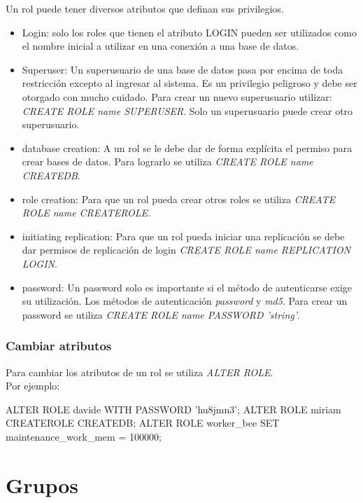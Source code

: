 Un rol puede tener diversos atributos que definan sus privilegios.\\

\begin{itemize}
\item Login: solo los roles que tienen el atributo LOGIN pueden ser utilizados como el nombre inicial a utilizar en una conexión a una base de datos. 
\item Superuser: Un superusuario de una base de datos pasa por encima de toda restricción excepto al ingresar al sistema. Es un privilegio peligroso y debe ser otorgado con mucho cuidado. Para crear un nuevo superusuario utilizar: \textit{CREATE ROLE name SUPERUSER}. Solo un superusuario puede crear otro superusuario.
\item database creation: A un rol se le debe dar de forma explícita el permiso para crear bases de datos. Para lograrlo se utiliza \textit{CREATE ROLE name CREATEDB}.
\item role creation: Para que un rol pueda crear otros roles se utiliza \textit{CREATE ROLE name CREATEROLE}.
\item initiating replication: Para que un rol pueda iniciar una replicación se debe dar permisos de replicación de login \textit{CREATE ROLE name REPLICATION LOGIN}. 
\item password: Un password solo es importante si el método de autenticarse exige su utilización. Los métodos de autenticación \textit{password} y \textit{md5}. Para crear un password se utiliza \textit{CREATE ROLE name PASSWORD 'string'}.
\end{itemize}

\subsubsection{Cambiar atributos}

Para cambiar los atributos de un rol se utiliza \textit{ALTER ROLE}.\\

Por ejemplo:\\

\begin{pyglist}
ALTER ROLE davide WITH PASSWORD 'hu8jmn3';
ALTER ROLE miriam CREATEROLE CREATEDB;
ALTER ROLE worker_bee SET maintenance_work_mem = 100000;
\end{pyglist}


\section{Grupos}

